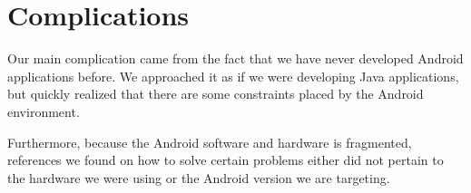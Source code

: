 \section*{Complications}

Our main complication came from the fact that we have never developed Android applications
  before.
We approached it as if we were developing Java applications, but quickly realized that 
  there are some constraints placed by the Android environment.

Furthermore, because the Android software and hardware is fragmented, references we found
  on how to solve certain problems either did not pertain to the hardware we were using
  or the Android version we are targeting.